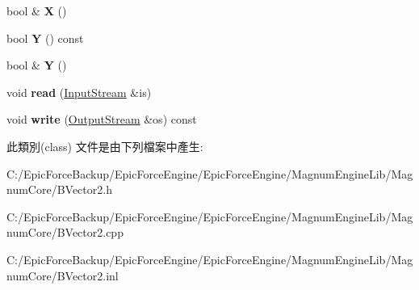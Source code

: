 \begin{DoxyCompactItemize}
\item 
bool \& {\bfseries X} ()\hypertarget{class_magnum_1_1_b_vector2_aa8c60f47da18379ac304c7e4e9345c1b}{}\label{class_magnum_1_1_b_vector2_aa8c60f47da18379ac304c7e4e9345c1b}

\item 
bool {\bfseries Y} () const \hypertarget{class_magnum_1_1_b_vector2_aea1eeff2850ff988a1627caa948635e7}{}\label{class_magnum_1_1_b_vector2_aea1eeff2850ff988a1627caa948635e7}

\item 
bool \& {\bfseries Y} ()\hypertarget{class_magnum_1_1_b_vector2_afafb1e23ca8dc85f8ae3ec101d5c86b1}{}\label{class_magnum_1_1_b_vector2_afafb1e23ca8dc85f8ae3ec101d5c86b1}

\item 
void {\bfseries read} (\hyperlink{class_magnum_1_1_input_stream}{Input\+Stream} \&is)\hypertarget{class_magnum_1_1_b_vector2_af55ea5d8704d0456b89d37f2dca28ff1}{}\label{class_magnum_1_1_b_vector2_af55ea5d8704d0456b89d37f2dca28ff1}

\item 
void {\bfseries write} (\hyperlink{class_magnum_1_1_output_stream}{Output\+Stream} \&os) const \hypertarget{class_magnum_1_1_b_vector2_a9c08307da66016196c8d048a8a2fd87a}{}\label{class_magnum_1_1_b_vector2_a9c08307da66016196c8d048a8a2fd87a}

\end{DoxyCompactItemize}


此類別(class) 文件是由下列檔案中產生\+:\begin{DoxyCompactItemize}
\item 
C\+:/\+Epic\+Force\+Backup/\+Epic\+Force\+Engine/\+Epic\+Force\+Engine/\+Magnum\+Engine\+Lib/\+Magnum\+Core/B\+Vector2.\+h\item 
C\+:/\+Epic\+Force\+Backup/\+Epic\+Force\+Engine/\+Epic\+Force\+Engine/\+Magnum\+Engine\+Lib/\+Magnum\+Core/B\+Vector2.\+cpp\item 
C\+:/\+Epic\+Force\+Backup/\+Epic\+Force\+Engine/\+Epic\+Force\+Engine/\+Magnum\+Engine\+Lib/\+Magnum\+Core/B\+Vector2.\+inl\end{DoxyCompactItemize}
